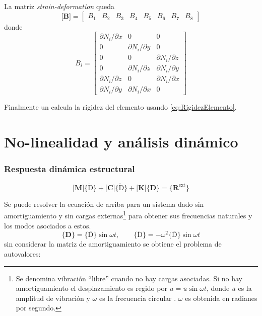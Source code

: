 \documentclass[11pt, a4paper,titlepage]{article}
\newcommand{\Mme}[1]{\boldsymbol{[}\mathbf{#1} \boldsymbol{]}}
\newcommand{\Cme}[1]{\boldsymbol{\{ }\mathbf{#1} \boldsymbol{\}} }
\newcommand{\CD}{\Cme{D}}
\newcommand{\MB}{\Mme{B}}
\let\oldpart\part
\renewcommand{\part}[1]{\clearpage \oldpart{#1}}
\begin{document}
La matriz \textit{strain-deformation} queda
\[
\MB = \begin{bmatrix}
B_1 &B_2 &B_3 &B_4 &B_5 &B_6 &B_7 &B_8
\end{bmatrix}
\]
donde
\begin{equation}
B_{i}=\left[\begin{array}{ccc}{\partial N_{i} / \partial x} & {0} & {0} \\ {0} & {\partial N_{i} / \partial y} & {0} \\ {0} & {0} & {\partial N_{i} / \partial z} \\ {0} & {\partial N_{i} / \partial z} & {\partial N_{i} / \partial y} \\ {\partial N_{i} / \partial z} & {0} & {\partial N_{i} / \partial x} \\ {\partial N_{i} / \partial y} & {\partial N_{i} / \partial x} & {0}\end{array}\right]
\end{equation}

Finalmente un calcula la rigidez del elemento usando \eqref{eq:RigidezElemento}.






\part{No-linealidad y análisis dinámico}

\section{Respuesta dinámica estructural}

\begin{equation} \label{eq:ecuacionDinamicaGeneral}
	\Mme{M}\Cme{\boldsymbol{\ddot{\mathrm{D}}}} + \Mme{C}\Cme{\boldsymbol{\dot{\mathrm{D}}}}+\Mme{K} \Cme{D} =\Cme{R^{\mathrm{ext}}}
\end{equation}

Se puede resolver la ecuación de arriba para un sistema dado sin amortiguamiento y sin cargas externas\footnote{Se denomina vibración ``libre'' cuando no hay cargas asociadas. Si no hay amortiguamiento el desplazamiento es regido por $u= \bar{u}\sin \omega t$, donde $\bar{u}$ es la amplitud de vibración y $\omega$ es la frecuencia circular \cite{cook2007concepts}. $\omega$ es obtenida en radianes por segundo.} para obtener sus frecuencias naturales y los modos asociados a estos.
\[
\CD = \Cme{\boldsymbol{\bar{\mathrm D}}}\sin \omega t, \qquad \Cme{\boldsymbol{\ddot{\mathrm{D}}}}= -\omega^2 \Cme{\boldsymbol{\bar{\mathrm D}}} \sin \omega t
\]
sin considerar la matriz de amortiguamiento se obtiene el problema de autovalores:
\end{document}
